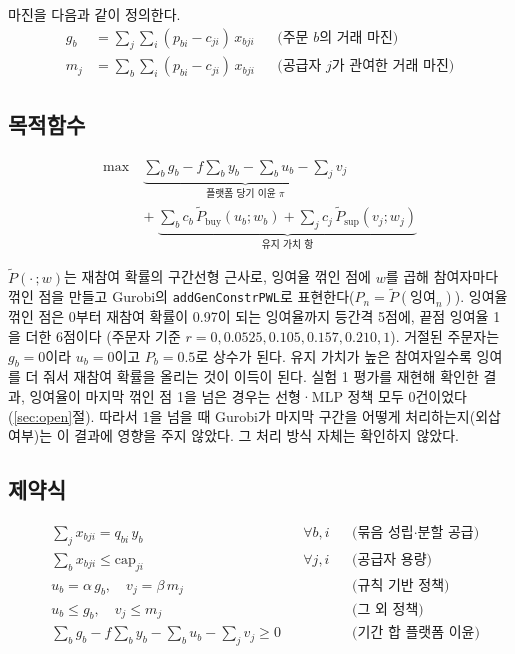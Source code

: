 \documentclass[11pt,a4paper]{article}
\begin{document}
마진을 다음과 같이 정의한다.
\begin{align}
  g_b &= \sum_{j}\sum_{i}(p_{bi}-c_{ji})\,x_{bji} && \text{(주문 $b$의 거래 마진)}\\
  m_j &= \sum_{b}\sum_{i}(p_{bi}-c_{ji})\,x_{bji} && \text{(공급자 $j$가 관여한 거래 마진)}
\end{align}

\subsection{목적함수}

\begin{equation}
\begin{aligned}
  \max\ & \underbrace{\sum_b g_b - f\sum_b y_b - \sum_b u_b - \sum_j v_j}_{\text{플랫폼 당기 이윤 } \pi}\\
  &+\; \underbrace{\sum_b c_b\,\tilde P_{\mathrm{buy}}(u_b; w_b) + \sum_j c_j\,\tilde P_{\mathrm{sup}}(v_j; w_j)}_{\text{유지 가치 항}}
\end{aligned}
\end{equation}

$\tilde P(\cdot\,;w)$는 재참여 확률의 구간선형 근사로, 잉여율 꺾인 점에 $w$를 곱해
참여자마다 꺾인 점을 만들고 Gurobi의 \texttt{addGenConstrPWL}로 표현한다($P_n=\tilde P(\text{잉여}_n)$).
잉여율 꺾인 점은 0부터 재참여 확률이 0.97이 되는 잉여율까지 등간격 5점에, 끝점 잉여율 1을 더한 6점이다
(주문자 기준 $r=0, 0.0525, 0.105, 0.157, 0.210, 1$). 거절된 주문자는 $g_b=0$이라 $u_b=0$이고 $P_b=0.5$로 상수가 된다.
유지 가치가 높은 참여자일수록 잉여를 더 줘서 재참여 확률을 올리는 것이 이득이 된다.
실험 1 평가를 재현해 확인한 결과, 잉여율이 마지막 꺾인 점 1을 넘은 경우는 선형·MLP 정책 모두 0건이었다(\ref{sec:open}절).
따라서 1을 넘을 때 Gurobi가 마지막 구간을 어떻게 처리하는지(외삽 여부)는 이 결과에 영향을 주지 않았다. 그 처리 방식 자체는 확인하지 않았다.

\subsection{제약식}

\begin{align}
  &\sum_{j} x_{bji} = q_{bi}\,y_b && \forall b,i && \text{(묶음 성립·분할 공급)}\label{c:bundle}\\
  &\sum_{b} x_{bji} \le \mathrm{cap}_{ji} && \forall j,i && \text{(공급자 용량)}\label{c:cap}\\
  &u_b = \alpha\, g_b,\quad v_j = \beta\, m_j && && \text{(규칙 기반 정책)}\label{c:rule}\\
  &u_b \le g_b,\quad v_j \le m_j && && \text{(그 외 정책)}\label{c:free}\\
  &\sum_b g_b - f\sum_b y_b - \sum_b u_b - \sum_j v_j \ge 0 && && \text{(기간 합 플랫폼 이윤)}\label{c:profit}
\end{align}
\end{document}

